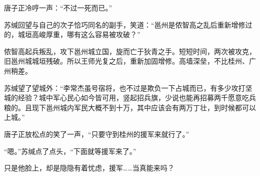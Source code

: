 唐子正冷哼一声：“不过一死而已。”

苏缄回望与自己的次子恰巧同名的副手，笑道：“邕州是侬智高之乱后重新增修过的，城垣高峻厚重，哪有这么容易被攻破？”

侬智高起兵叛乱，攻下邕州城立国，旋而亡于狄青之手。短短时间，两次被攻克，旧邕州城城垣残破。所以王师光复之后，重新加固增修。高墙深垒，不比桂州、广州稍差。

苏缄望了望城外：“李常杰虽号宿将，也不过是欺负一下占城而已，有多少攻打坚城的经验？城中军心民心如今皆可用，竖起招兵旗，少说也能再招募两千愿意吃兵粮的。且现下邕州城内军民大概不到十万，其中应该会有两万丁壮，到时候都可以上城。”

唐子正放松点的笑了一声，“只要守到桂州的援军来就行了。”

“嗯。”苏缄点了点头，“下面就等援军来了。”

只是他脸上，却是隐隐有着忧虑，援军……当真能来吗？

